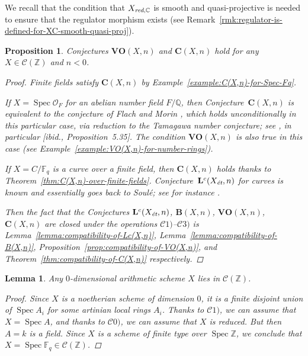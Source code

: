 \documentclass[10pt,a4paper,oneside,draft]{article}
\DeclareMathOperator{\Spec}{Spec}
\newcommand{\CC}{\mathbb{C}}
\newcommand{\FF}{\mathbb{F}}
\newcommand{\QQ}{\mathbb{Q}}
\newcommand{\ZZ}{\mathbb{Z}}
\newcommand{\et}{\text{\it \'{e}t}}
\newcommand{\red}{\text{\it red}}
\theoremstyle{myplain}
\newtheorem{proposition}[theorem]{Proposition}
\newtheorem{lemma}[theorem]{Lemma}
\theoremstyle{mydefinition}
\numberwithin{equation}{section}
\begin{document}
We recall that the condition that $X_{\red,\CC}$ is smooth and quasi-projective
is needed to ensure that the regulator morphism exists
(see Remark~\ref{rmk:regulator-is-defined-for-XC-smooth-quasi-proj}).

\begin{proposition}
  \label{prop:C(X,n)-holds-for-C(Z)}
  Conjectures $\mathbf{VO} (X,n)$ and $\mathbf{C} (X,n)$ hold for any
  $X \in \mathcal{C} (\ZZ)$ and $n < 0$.

  \begin{proof}
    Finite fields satisfy $\mathbf{C} (X,n)$ by
    Example~\ref{example:C(X,n)-for-Spec-Fq}.

    If $X = \Spec \mathcal{O}_F$ for an abelian number field $F/\QQ$, then
    Conjecture~$\mathbf{C} (X,n)$ is equivalent to the conjecture of Flach and
    Morin \cite[Conjecture~5.12]{Flach-Morin-2018}, which holds unconditionally
    in this particular case, via reduction to the Tamagawa number conjecture;
    see \cite[\S 5.8.3]{Flach-Morin-2018}, in particular
    [ibid., Proposition~5.35]. The condition $\mathbf{VO} (X,n)$ is also true in
    this case (see Example~\ref{example:VO(X,n)-for-number-rings}).

    If $X = C/\FF_q$ is a curve over a finite field, then $\mathbf{C} (X,n)$
    holds thanks to
    Theorem~\ref{thm:C(X,n)-over-finite-fields}.
    Conjecture~$\mathbf{L}^c (X_\et,n)$ for curves is known and essentially goes
    back to Soul\'{e}; see for instance \cite[Proposition~4.3]{Geisser-2017}.

    Then the fact that the Conjectures $\mathbf{L}^c (X_\et,n)$,
    $\mathbf{B} (X,n)$, $\mathbf{VO} (X,n)$, $\mathbf{C} (X,n)$ are closed under
    the operations $\mathcal{C}1)$--$\mathcal{C}3)$ is
    Lemma~\ref{lemma:compatibility-of-Lc(X,n)},
    Lemma~\ref{lemma:compatibility-of-B(X,n)},
    Proposition~\ref{prop:compatibility-of-VO(X,n)},
    and Theorem~\ref{thm:compatibility-of-C(X,n)}
    respectively.
  \end{proof}
\end{proposition}

\begin{lemma}
  Any $0$-dimensional arithmetic scheme $X$ lies in $\mathcal{C} (\ZZ)$.

  \begin{proof}
    Since $X$ is a noetherian scheme of dimension $0$, it is a finite disjoint
    union of $\Spec A_i$ for some artinian local rings $A_i$. Thanks to
    $\mathcal{C}1)$, we can assume that $X = \Spec A$, and thanks to
    $\mathcal{C}0)$, we can assume that $X$ is reduced. But then $A = k$ is a
    field. Since $X$ is a scheme of finite type over $\Spec \ZZ$, we conclude
    that $X = \Spec \FF_q \in \mathcal{C} (\ZZ)$.
  \end{proof}
\end{lemma}
\end{document}
